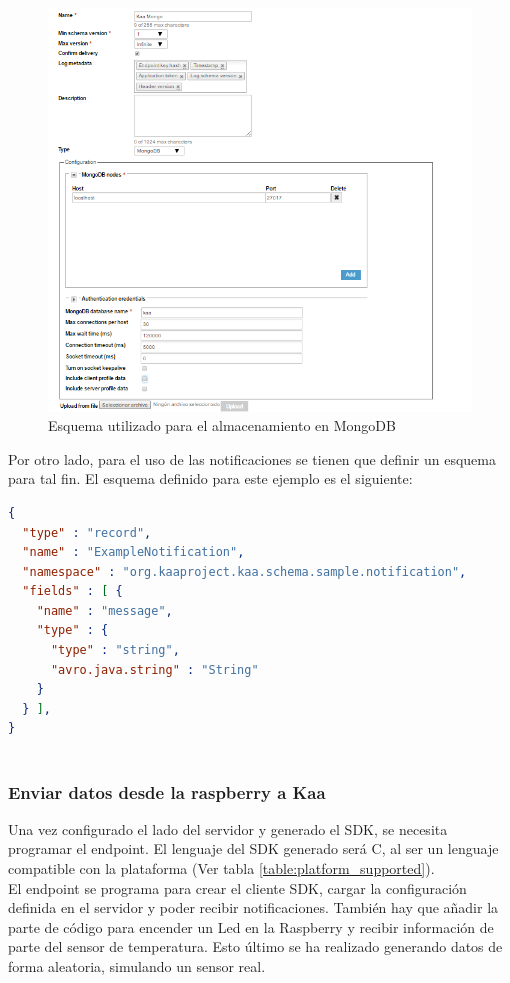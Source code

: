 \documentclass[12pt, twoside]{book}
\begin{document}
\begin{figure}[H]
\centering
\includegraphics[scale=0.6]{images/mongodb}
\caption{Esquema utilizado para el almacenamiento en MongoDB}\label{L508}
\end{figure}

Por otro lado, para el uso de las notificaciones se tienen que definir un esquema para tal fin. El esquema definido para este ejemplo es el siguiente:
\begin{lstlisting}[language=json]
{
  "type" : "record",
  "name" : "ExampleNotification",
  "namespace" : "org.kaaproject.kaa.schema.sample.notification",
  "fields" : [ {
    "name" : "message",
    "type" : {
      "type" : "string",
      "avro.java.string" : "String"
    }
  } ],
}
 
\end{lstlisting}
\subsubsection*{Enviar datos desde la raspberry a Kaa}
Una vez configurado el lado del servidor y generado el SDK, se necesita programar el endpoint. El lenguaje del SDK generado será C, al ser un lenguaje compatible con la plataforma (Ver tabla \ref{table:platform_supported}).\\
El endpoint se programa para crear el cliente SDK, cargar la configuración definida en el servidor y poder recibir notificaciones. También hay que añadir la parte de código para encender un Led en la Raspberry y recibir información de parte del sensor de temperatura. Esto último se ha realizado generando datos de forma aleatoria, simulando un sensor real. 
\end{document}
